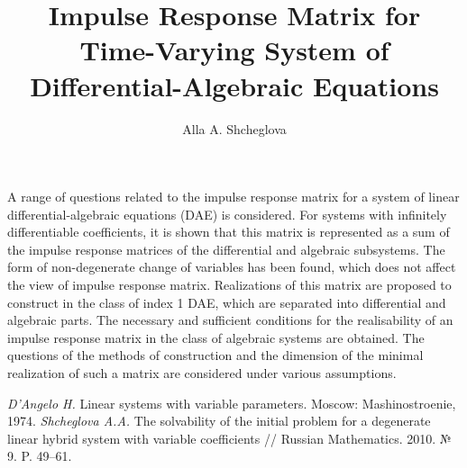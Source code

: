 \title{Impulse Response Matrix for Time-Varying System of Differential-Algebraic Equations}
\author{Alla A. Shcheglova}


\maketitle

\begin{abstract}
\end{abstract}


A range of questions related to the impulse response matrix \cite{reff1} for a system of linear differential-algebraic equations (DAE) \cite{reff2} is considered. For systems with infinitely differentiable coefficients, it is shown that this matrix is represented as a sum of the impulse response matrices of the differential and algebraic subsystems.  The form of  non-degenerate change of variables has been found, which does not affect the view of impulse response matrix.  Realizations of this matrix are proposed to construct  in the class of index 1 DAE, which are separated into differential and algebraic parts. The necessary and sufficient conditions for the realisability  of an impulse response matrix in the class of algebraic systems are obtained. The questions of the methods of construction and  the dimension of the minimal realization of such a matrix are considered under various assumptions.

\begin{thebibliography}{9}
{\sl D'Angelo H.} Linear systems with variable parameters.  Moscow:  Mashinostroenie, 1974.  
{\sl Shcheglova A.A.} The solvability of the initial problem for a degenerate linear hybrid system with variable coefficients // Russian Mathematics.  2010. № 9.  P. 49--61.  
\end{thebibliography}
